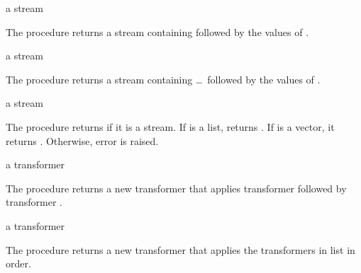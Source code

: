 \begin{procedure}
\end{procedure}
\returns{} a stream

The  procedure returns a stream containing  followed by the
values of .

\begin{procedure}
\end{procedure}
\returns{} a stream

The  procedure returns a stream containing  \ldots\ followed by
the values of .

\begin{procedure}
\end{procedure}
\returns{} a stream

The  procedure returns  if it is a stream. If  is a
list,  returns . If  is a vector,
it returns . Otherwise, error  is raised.

\begin{procedure}
\end{procedure}
\returns{} a transformer

The  procedure returns a new transformer that applies
transformer  followed by transformer .

\begin{procedure}
\end{procedure}
\returns{} a transformer

The  procedure returns a new transformer that applies the
transformers in list  in order.
